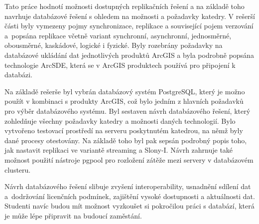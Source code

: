 \label{kZaver}
Tato práce hodnotí možnosti dostupných replikačních řešení a na základě toho navrhuje databázové řešení s ohledem na možnosti a požadavky katedry. V rešerší části byly vymezeny pojmy synchronizace, replikace a související pojem verzování a~popsána replikace včetně variant synchronní, asynchronní, jednosměrné, obou\-smě\-rné, kaskádové, logické i fyzické. Byly rozebrány požadavky na databázové ukládání dat jednotlivých produktů ArcGIS a byla podrobně popsána technologie ArcSDE, která se v ArcGIS produktech používá pro připojení k databázi.

Na základě rešerše byl vybrán databázový systém PostgreSQL, který je možno použít v kombinaci s produkty ArcGIS, což bylo jedním z hlavních požadavků pro výběr databázového systému. Byl sestaven návrh databázového řešení, který zohledňuje všechny požadavky katedry a možnosti daných technologií. Bylo vytvořeno testovací prostředí na serveru poskytnutém katedrou, na němž byly dané procesy otestovány. Na základě toho byl pak sepsán podrobný popis toho, jak nastavit replikaci ve variantě streaming a Slony-I. Návrh zahrnuje také možnost použití nástroje pgpool pro rozložení zátěže mezi servery v databázovém clusteru.

Návrh databázového řešení slibuje zvyšení interoperability, usnadnění sdílení dat a~dodržování licenčních podmínek, zajištění vysoké dostupnosti a aktuálnosti dat. Studenti navíc budou mít možnost vyzkoušet si pokročilou práci s databází, která je může lépe připravit na budoucí zaměstání.
